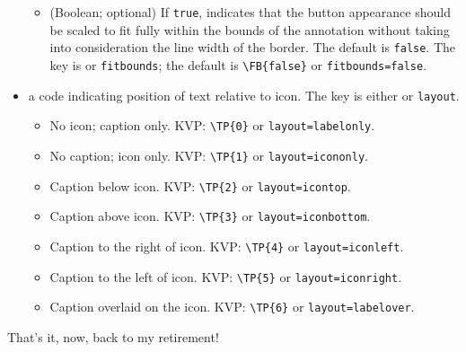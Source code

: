 \documentclass{article}
\begin{document}
\begin{itemize}
\begin{itemize}
  \item [\textbf{FB}] (Boolean; optional) If \texttt{true}, indicates that the button appearance should be scaled to fit
  fully within the bounds of the annotation  without taking into consideration the line width of the border.
  The default is \texttt{false}. The key is  or  \texttt{fitbounds}; the default
  is \verb!\FB{false}! or \verb!fitbounds=false!.
  \end{itemize}
  \item [\textbf{TP}] a code indicating position of text relative to icon. The key is either
   or \texttt{layout}.
  \begin{itemize}
    \item[0] No icon; caption only. KVP: \verb!\TP{0}! or \texttt{layout=labelonly}.
    \item[1] No caption; icon only. KVP: \verb!\TP{1}! or \texttt{layout=icononly}.
    \item[2] Caption below icon. KVP: \verb!\TP{2}! or \texttt{layout=icontop}.
    \item[3] Caption above icon. KVP: \verb!\TP{3}! or \texttt{layout=iconbottom}.
    \item[4] Caption to the right of icon. KVP: \verb!\TP{4}! or \texttt{layout=iconleft}.
    \item[5] Caption to the left of icon. KVP: \verb!\TP{5}! or \texttt{layout=iconright}.
    \item[6] Caption overlaid on the icon. KVP: \verb!\TP{6}! or \texttt{layout=labelover}.
  \end{itemize}
\end{itemize}


\medskip\noindent That's it, now, back to my retirement!
\end{document}
